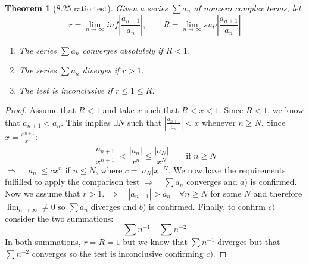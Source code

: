 \documentclass[aps,pra,notitlepage,amsmath,amssymb,letterpaper,12pt]{revtex4-1}
\newtheorem{theorem}{Theorem}
\begin{document}
\begin{theorem}[8.25 ratio test]
Given a series $\sum a_{n}$ of nonzero complex terms, let
\[r = \lim_{n \to \infty} inf \left| \frac{a_{n+1}}{a_{n}}\right|, \qquad R = \lim_{n \to \infty} sup \left| \frac{a_{n+1}}{a_{n}}\right|\]
\begin{enumerate}[\upshape a)]
  \item The series $\sum a_{n}$ converges absolutely if $R < 1$.
  \item The series $\sum a_{n}$ diverges if $r>1$.
  \item The test is inconclusive if $r \leq 1 \leq R$.
\end{enumerate}
\end{theorem}
\begin{proof}
Assume that $R<1$ and take $x$ such that $R<x<1$. Since $R<1$, we know that $a_{n+1}<a_n$. This implies $\exists N$ such that $|\frac{a_{n+1}}{a_n}|<x$ whenever $n\geq N$. Since $x = \frac{x^{n+1}}{x^n}$: $$\frac{|a_{n+1}|}{x^{n+1}}<\frac{|a_n|}{x^n}\leq \frac{|a_N|}{x^N} \qquad \textrm{if }n\geq N$$
$\Rightarrow \quad |a_n|\leq cx^n$ if $n\leq N$, where $c=|a_N|x^{-N}$.  We now have the requirements fulfilled to apply the comparison test $\Rightarrow \quad \sum a_n$ converges and $a)$ is confirmed.
Now we assume that $r>1$.  $\Rightarrow \quad |a_{n+1}|>a_n \quad \forall n\geq N$ for some $N$ and therefore $\lim_{n\to \infty} \neq 0$ so $\sum a_n$ diverges and $b)$ is confirmed.
Finally, to confirm $c)$ consider the two summations: $$\sum n^{-1} \quad \sum n^{-2}$$  In both summations, $r=R=1$ but we know that $\sum n^{-1}$ diverges but that $\sum n^{-2}$ converges so the test is inconclusive confirming $c)$.
\end{proof}
\end{document}
